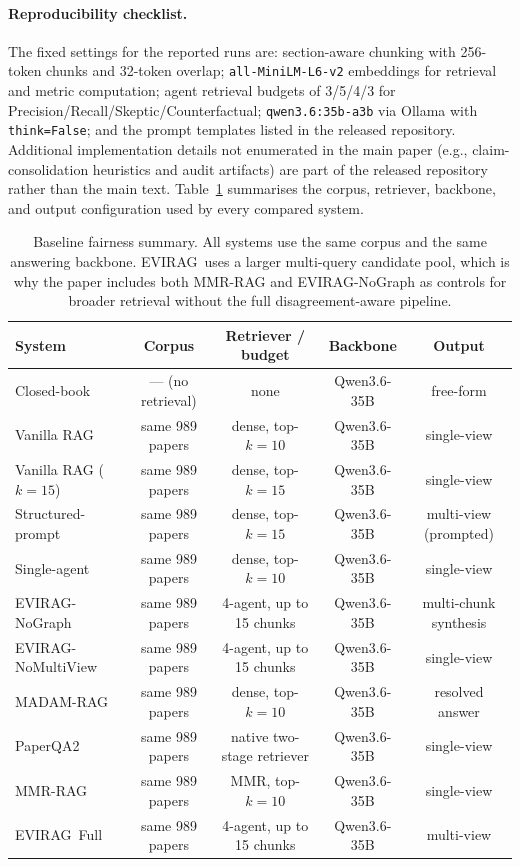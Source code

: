 \documentclass[11pt]{article}
\newcommand{\system}{\textsc{EVIRAG}\xspace}
\begin{document}
\paragraph{Reproducibility checklist.}
The fixed settings for the reported runs are: section-aware chunking with
256-token chunks and 32-token overlap; \texttt{all-MiniLM-L6-v2} embeddings for
retrieval and metric computation; agent retrieval budgets of 3/5/4/3 for
Precision/Recall/Skeptic/Counterfactual; \texttt{qwen3.6:35b-a3b} via Ollama
with \texttt{think=False}; and the prompt templates listed in the released repository.  Additional implementation details not enumerated in the main paper
(e.g., claim-consolidation heuristics and audit artifacts) are part of the
released repository rather than the main text.
Table~\ref{tab:fairness} summarises the corpus, retriever, backbone, and
output configuration used by every compared system.

\begin{table}[t]
\centering\small
\setlength{\tabcolsep}{5pt}
\begin{tabular}{@{}lcccc@{}}
\toprule
\textbf{System} & \textbf{Corpus} & \textbf{Retriever / budget} & \textbf{Backbone} & \textbf{Output} \\
\midrule
Closed-book & --- (no retrieval) & none & Qwen3.6-35B & free-form \\
Vanilla RAG & same 989 papers & dense, top-$k{=}10$ & Qwen3.6-35B & single-view \\
Vanilla RAG ($k{=}15$) & same 989 papers & dense, top-$k{=}15$ & Qwen3.6-35B & single-view \\
Structured-prompt & same 989 papers & dense, top-$k{=}15$ & Qwen3.6-35B & multi-view (prompted) \\
Single-agent & same 989 papers & dense, top-$k{=}10$ & Qwen3.6-35B & single-view \\
\system-NoGraph & same 989 papers & 4-agent, up to 15 chunks & Qwen3.6-35B & multi-chunk synthesis \\
\system-NoMultiView & same 989 papers & 4-agent, up to 15 chunks & Qwen3.6-35B & single-view \\
MADAM-RAG & same 989 papers & dense, top-$k{=}10$ & Qwen3.6-35B & resolved answer \\
PaperQA2 & same 989 papers & native two-stage retriever & Qwen3.6-35B & single-view \\
MMR-RAG & same 989 papers & MMR, top-$k{=}10$ & Qwen3.6-35B & single-view \\
\system\ Full & same 989 papers & 4-agent, up to 15 chunks & Qwen3.6-35B & multi-view \\
\bottomrule
\end{tabular}
\caption{Baseline fairness summary.  All systems use the same corpus and the
same answering backbone.  \system\ uses a larger multi-query candidate pool,
which is why the paper includes both MMR-RAG and \system-NoGraph as controls
for broader retrieval without the full disagreement-aware pipeline.}
\label{tab:fairness}
\end{table}
\end{document}
